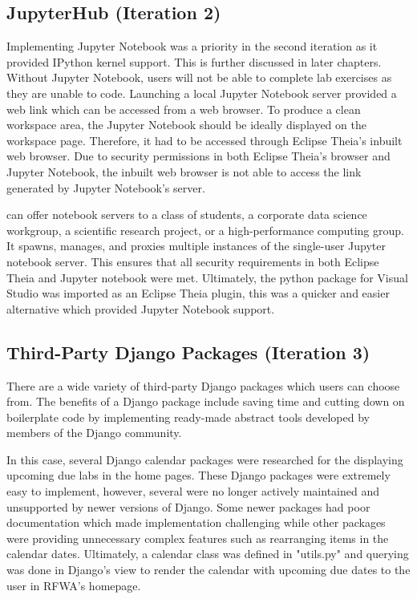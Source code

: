 \documentclass{l4proj}
\begin{document}
\subsection {JupyterHub (Iteration 2)}

Implementing Jupyter Notebook was a priority in the second iteration as it provided IPython kernel support. This is further discussed in later chapters.  Without Jupyter Notebook, users will not be able to complete lab exercises as they are unable to code. Launching a local Jupyter Notebook server provided a web link which can be accessed from a web browser. To produce a clean workspace area, the Jupyter Notebook should be ideally displayed on the workspace page. Therefore, it had to be accessed through Eclipse Theia's inbuilt web browser. Due to security permissions in both Eclipse Theia's browser and Jupyter Notebook, the inbuilt web browser is not able to access the link generated by Jupyter Notebook's server. 

\cite{JupyterHub} can offer notebook servers to a class of students, a corporate data science workgroup, a scientific research project, or a high-performance computing group. It spawns, manages, and proxies multiple instances of the single-user Jupyter notebook server. This ensures that all security requirements in both Eclipse Theia and Jupyter notebook were met. Ultimately, the python package for Visual Studio was imported as an Eclipse Theia plugin, this was a quicker and easier alternative which provided Jupyter Notebook support.

\subsection {Third-Party Django Packages (Iteration 3)}

There are a wide variety of third-party Django packages which users can choose from. 
The benefits of a Django package include saving time and cutting down on boilerplate code by implementing ready-made abstract tools developed by members of the Django community.

In this case, several Django calendar packages were researched for the displaying upcoming due labs in the home pages. These Django packages were extremely easy to implement, however, several were no longer actively maintained and unsupported by newer versions of Django. Some newer packages had poor documentation which made implementation challenging while other packages were providing unnecessary complex features such as rearranging items in the calendar dates. Ultimately, a calendar class was defined in "utils.py" and querying was done in Django's view to render the calendar with upcoming due dates to the user in RFWA's homepage. 
\end{document}
